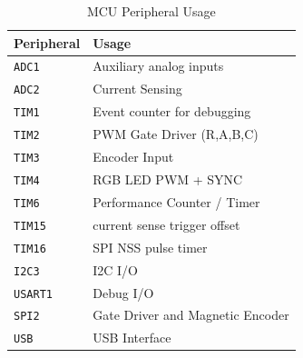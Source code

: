 \documentclass[12pt,a4paper,oneside,openany]{article}
\begin{document}
\begin{table}[htbp]
\caption{MCU Peripheral Usage}
\begin{center}
\begin{tabular}{ll} \toprule
 Peripheral & Usage \\
\midrule \texttt{ADC1} & Auxiliary analog inputs \\
\texttt{ADC2} & Current Sensing \\
\midrule
\texttt{TIM1} & Event counter for debugging \\
\texttt{TIM2} & PWM Gate Driver (R,A,B,C) \\
\texttt{TIM3} & Encoder Input \\
\texttt{TIM4} & RGB LED PWM + SYNC\\
\texttt{TIM6} & Performance Counter / Timer \\
\texttt{TIM15} & current sense trigger offset \\
\texttt{TIM16} & SPI NSS pulse timer \\
\midrule
\texttt{I2C3} & I2C I/O \\
\texttt{USART1} & Debug I/O \\ 
\texttt{SPI2} & Gate Driver and Magnetic Encoder \\
\texttt{USB} & USB Interface \\
\bottomrule
\end{tabular}
\end{center}
\label{tab:mcu-peripherals}
\end{table}%
\end{document}
